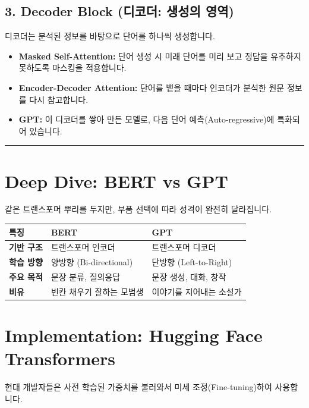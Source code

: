 \documentclass[11pt,a4paper]{book}
\theoremstyle{definition}
\begin{document}
\subsection{3. Decoder Block (디코더: 생성의 영역)}
디코더는 분석된 정보를 바탕으로 단어를 하나씩 생성합니다.
\begin{itemize}
    \item \textbf{Masked Self-Attention:} 단어 생성 시 미래 단어를 미리 보고 정답을 유추하지 못하도록 마스킹을 적용합니다.
    \item \textbf{Encoder-Decoder Attention:} 단어를 뱉을 때마다 인코더가 분석한 원문 정보를 다시 참고합니다.
    \item \textbf{GPT:} 이 디코더를 쌓아 만든 모델로, 다음 단어 예측(Auto-regressive)에 특화되어 있습니다.
\end{itemize}


\vspace{0.5cm}\hrule\vspace{0.5cm}

\section{Deep Dive: BERT vs GPT}

같은 트랜스포머 뿌리를 두지만, 부품 선택에 따라 성격이 완전히 달라집니다.

\begin{center}
\begin{tabular}{>{\raggedright\arraybackslash}p{2.5cm} p{5cm} p{5cm}}
\toprule
\textbf{특징} & \textbf{BERT} & \textbf{GPT} \\ \midrule
\textbf{기반 구조} & 트랜스포머 인코더 & 트랜스포머 디코더 \\
\textbf{학습 방향} & 양방향 (Bi-directional) & 단방향 (Left-to-Right) \\
\textbf{주요 목적} & 문장 분류, 질의응답 & 문장 생성, 대화, 창작 \\
\textbf{비유} & 빈칸 채우기 잘하는 모범생 & 이야기를 지어내는 소설가 \\ \bottomrule
\end{tabular}
\end{center}

\section{Implementation: Hugging Face Transformers}

현대 개발자들은 사전 학습된 가중치를 불러와서 미세 조정(Fine-tuning)하여 사용합니다.
\end{document}
